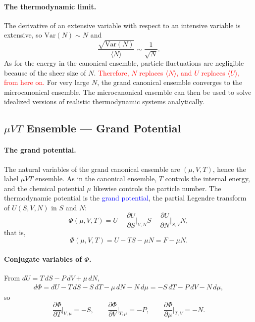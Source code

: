 \paragraph{The thermodynamic limit.}
The derivative of an extensive variable with respect to an intensive
variable is extensive, so $\mathrm{Var}(N)\sim N$ and
\begin{equation}
    \boxed{\frac{\sqrt{\mathrm{Var}(N)}}{\langle N\rangle}\sim\frac{1}{\sqrt{N}}.}
\end{equation}
As for the energy in the canonical ensemble, particle fluctuations are
negligible because of the sheer size of $N$.
\textcolor{red}{Therefore, $N$ replaces $\langle N\rangle$, and $U$ replaces
$\langle U\rangle$, from here on.}
For very large $N$, the grand canonical ensemble converges to the
microcanonical ensemble. The microcanonical ensemble can then be used to
solve idealized versions of realistic thermodynamic systems analytically.

\subsection{$\mu VT$ Ensemble --- Grand Potential}

\paragraph{The grand potential.}
The natural variables of the grand canonical ensemble are $(\mu,V,T)$, hence
the label $\mu VT$ ensemble. As in the canonical ensemble, $T$ controls the
internal energy, and the chemical potential $\mu$ likewise controls the
particle number. The thermodynamic potential is the
\textcolor{blue}{grand potential}, the partial Legendre transform of
$U(S,V,N)$ in $S$ and $N$:
\begin{equation*}
    \Phi(\mu,V,T)=U-\frac{\partial U}{\partial S}\bigg|_{V,N}S
    -\frac{\partial U}{\partial N}\bigg|_{S,V}N,
\end{equation*}
that is,
\begin{equation}
    \boxed{\Phi(\mu,V,T)=U-TS-\mu N=F-\mu N.}
\end{equation}

\paragraph{Conjugate variables of $\Phi$.}
From $dU=T\,dS-P\,dV+\mu\,dN$,
\begin{align*}
    d\Phi=dU-T\,dS-S\,dT-\mu\,dN-N\,d\mu=-S\,dT-P\,dV-N\,d\mu,
\end{align*}
so
\begin{equation}
    \boxed{\frac{\partial\Phi}{\partial T}\bigg|_{V,\mu}=-S,\qquad
    \frac{\partial\Phi}{\partial V}\bigg|_{T,\mu}=-P,\qquad
    \frac{\partial\Phi}{\partial\mu}\bigg|_{T,V}=-N.}
\end{equation}

